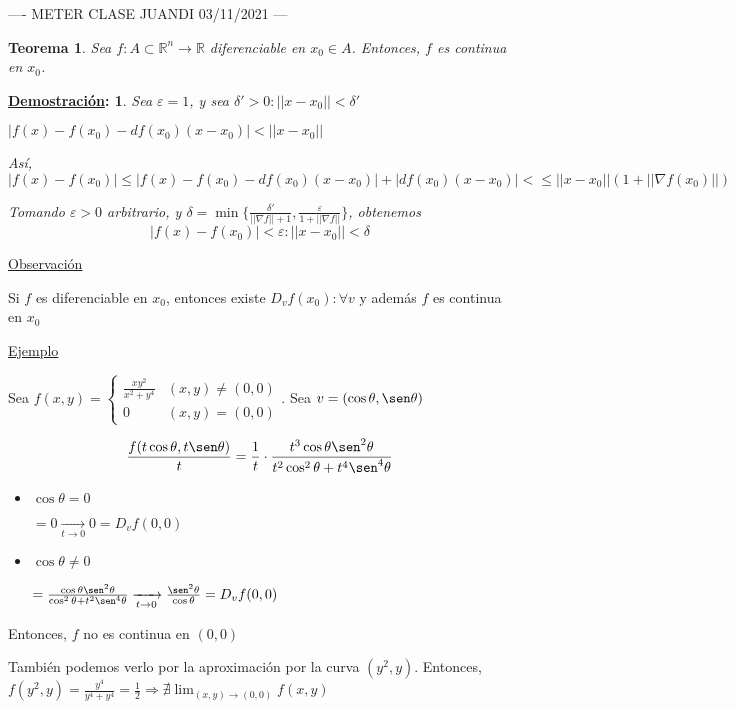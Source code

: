 \documentclass[10pt,a4paper,openright]{book}
\theoremstyle{break}
\newtheorem*{theo}{Teorema}
\newtheorem*{demo}{\underline{Demostración}:}
\begin{document}
---- METER CLASE JUANDI 03/11/2021 --- 

\begin{theo}
Sea $f: A \subset \mathbb{R}^n \to \mathbb{R}$ diferenciable en $x_0 \in A$. Entonces, $f$ es continua en $x_0$.
\end{theo}

\begin{demo}
Sea $\varepsilon = 1$, y sea $\delta' > 0 : || x - x_0 || < \delta'$

$|f(x) - f(x_0) - d f(x_0) (x - x_0)| < || x - x_0 ||$

Así, 
$$|f(x) - f(x_0)| \leq |f(x) - f(x_0) - df(x_0) (x - x_0)| + |df(x_0) (x - x_0)| < \leq ||x-x_0|| (1 + || \nabla f(x_0) ||)$$

Tomando $\varepsilon > 0$ arbitrario, y $\delta = \min\{ \frac{\delta'}{||\nabla f || + 1}, \frac{\varepsilon}{1 + || \nabla f||}\}$, obtenemos 
$$|f(x) - f(x_0)| < \varepsilon : ||x - x_0|| < \delta$$
\end{demo}

\underline{Observación}

Si $f$ es diferenciable en $x_0$, entonces existe $D_v f(x_0) : \forall v$ y además $f$ es continua en $x_0$

\underline{Ejemplo}

Sea $f(x,y) = \begin{cases} \frac{xy^2}{x^2 + y^4} & (x,y) \neq (0,0) \\ 0 & (x,y) = (0,0) \end{cases}$. Sea $v = (\cos\theta , \sen\theta)$

$$\frac{f(t\cos\theta, t \sen\theta)}{t} = \frac{1}{t} \cdot \frac{t^3 \cos\theta \sen^2 \theta}{t^2 \cos^2 \theta + t^4 \sen^4 \theta}$$

\begin{itemize}
\item $\cos\theta = 0$

$= 0 \xrightarrow[t \to 0]{} 0 = D_v f(0,0)$

\item $\cos\theta \neq 0$

$= \frac{\cos\theta \sen^2\theta}{\cos^2 \theta + t^2 \sen^4 \theta} \xrightarrow[t \to 0]{} \frac{\sen^2 \theta}{\cos\theta} = D_v f(0,0)$
\end{itemize}

Entonces, $f$ no es continua en $(0,0)$

También podemos verlo por la aproximación por la curva $(y^2,y)$. Entonces, $f(y^2, y) = \frac{y^4}{y^4 + y^4} = \frac{1}{2} \Rightarrow \nexists \lim_{(x,y) \to (0,0)} f(x,y)$
\end{document}
